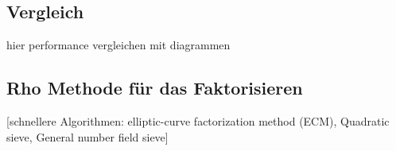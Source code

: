 \documentclass{scrartcl}
\begin{document}
\subsection{Vergleich}

hier performance vergleichen mit diagrammen

\subsection{Rho Methode für das Faktorisieren}
\label{sec:rho_faktorisieren}

[schnellere Algorithmen: elliptic-curve factorization method (ECM), Quadratic sieve, General number field sieve]

\cite{Pollard1975}

\newpage
\printbibliography[heading=bibintoc]
\end{document}
